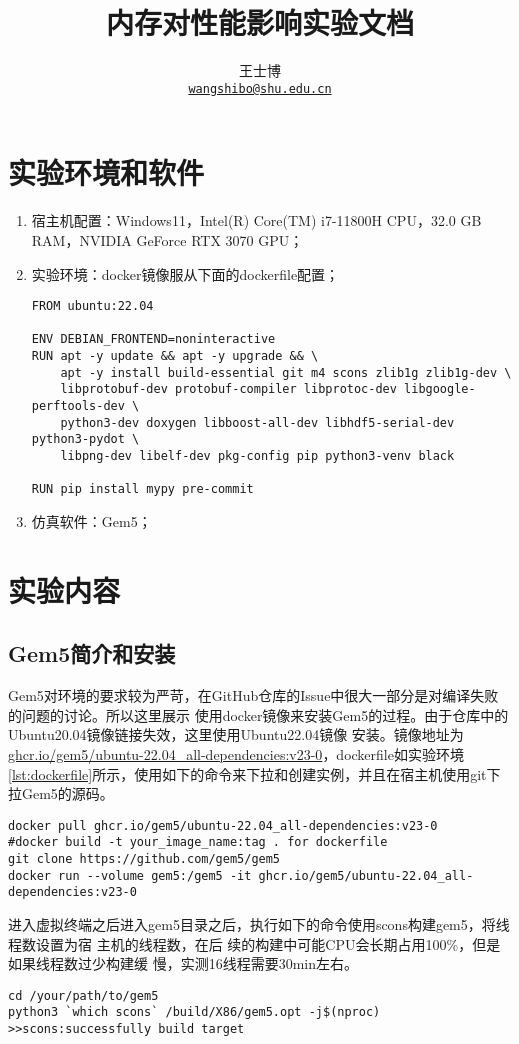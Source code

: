 \documentclass{article}
\title{\Huge 内存对性能影响实验文档}
\author{王士博 \\
\texttt{\href{mailto:wangshibo@shu.edu.cn}{wangshibo@shu.edu.cn}}
}
\begin{document}
\maketitle
\section{实验环境和软件}
\begin{enumerate}
  \item 宿主机配置：Windows11，Intel(R) Core(TM) i7-11800H CPU，32.0 GB RAM，NVIDIA GeForce RTX 3070 GPU；
  \item 实验环境：docker镜像服从下面的dockerfile配置；
   \begin{lstlisting}[style=dockerstyle,label=lst:dockerfile]
FROM ubuntu:22.04

ENV DEBIAN_FRONTEND=noninteractive
RUN apt -y update && apt -y upgrade && \
    apt -y install build-essential git m4 scons zlib1g zlib1g-dev \
    libprotobuf-dev protobuf-compiler libprotoc-dev libgoogle-perftools-dev \
    python3-dev doxygen libboost-all-dev libhdf5-serial-dev python3-pydot \
    libpng-dev libelf-dev pkg-config pip python3-venv black

RUN pip install mypy pre-commit
   \end{lstlisting}
  \item 仿真软件：Gem5\cite{Binkert2011gem5}；
\end{enumerate}
\section{实验内容}
\subsection{Gem5简介和安装}
Gem5对环境的要求较为严苛，在GitHub仓库的Issue中很大一部分是对编译失败的问题的讨论。所以这里展示
使用docker镜像来安装Gem5的过程。由于仓库中的Ubuntu20.04镜像链接失效，这里使用Ubuntu22.04镜像
安装。镜像地址为\url{ghcr.io/gem5/ubuntu-22.04_all-dependencies:v23-0}，dockerfile如实验环境
\ref{lst:dockerfile}所示，使用如下的命令来下拉和创建实例，并且在宿主机使用git下拉Gem5的源码。
\begin{lstlisting}[style=bashstyle]
docker pull ghcr.io/gem5/ubuntu-22.04_all-dependencies:v23-0
#docker build -t your_image_name:tag . for dockerfile
git clone https://github.com/gem5/gem5
docker run --volume gem5:/gem5 -it ghcr.io/gem5/ubuntu-22.04_all-dependencies:v23-0
\end{lstlisting}
进入虚拟终端之后进入gem5目录之后，执行如下的命令使用scons构建gem5，将线程数设置为宿
主机的线程数，在后	续的构建中可能CPU会长期占用100\%，但是如果线程数过少构建缓
慢，实测16线程需要30min左右。
\begin{lstlisting}[style=bashstyle]
cd /your/path/to/gem5
python3 `which scons` /build/X86/gem5.opt -j$(nproc)
>>scons:successfully build target
\end{lstlisting}
\end{document}
